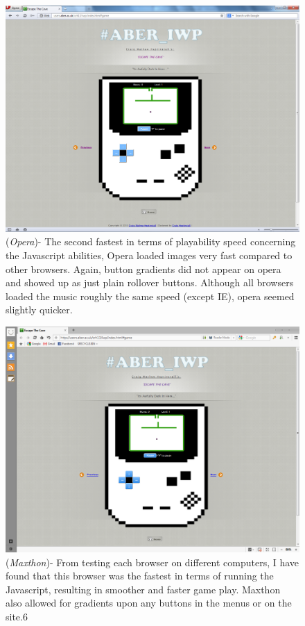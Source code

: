 \documentclass[a4paper]{article}
\begin{document}
\clearpage
 \begin{figure}[!ht]
   \centering
   \includegraphics[scale=0.38]{opera.png}
  \caption{(\emph{Opera})- The second fastest in terms of playability speed
concerning the Javascript abilities, Opera loaded images very fast compared to
other browsers. Again, button gradients did not appear on opera and showed up as
just plain rollover buttons. Although all browsers loaded the music roughly the
same speed (except IE), opera seemed slightly quicker.}
   \end{figure}
   \begin{figure}[!ht]
   \centering
   \includegraphics[scale=0.4]{maxthon.png}
  \caption{(\emph{Maxthon})- From testing each browser on different computers, I
have found that this browser was the fastest in terms of running the Javascript,
resulting in smoother and faster game play. Maxthon also allowed for gradients
upon any buttons in the menus or on the site.6}
   \end{figure}
\end{document}
